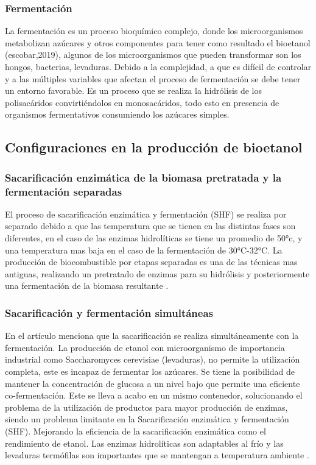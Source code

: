 \documentclass[12pt]{article}
\begin{document}
		
		
		\subsubsection{Fermentación}
		La fermentación es un proceso bioquímico complejo, donde los microorganismos metabolizan azúcares y otros componentes para tener como resultado el bioetanol (escobar,2019), algunos de los microorganismos que pueden transformar son los hongos, bacterias, levaduras. Debido a la complejidad, a que es difícil de controlar y a las múltiples variables que afectan el proceso de fermentación se debe tener un entorno favorable. \cite{rojas2010analisis}
		Es un proceso que se realiza la hidrólisis de los polisacáridos convirtiéndolos en monosacáridos, todo esto en presencia de organismos fermentativos consumiendo los azúcares simples.
		
		
		
		
		\subsection{Configuraciones en la producción de bioetanol}	
		\subsubsection{Sacarificación enzimática de la biomasa pretratada y la fermentación separadas}
		
		El proceso de sacarificación enzimática y fermentación (SHF) se realiza por separado debido a que las temperatura que se tienen en las distintas fases son diferentes, en el caso de las enzimas hidrolíticas se tiene un promedio de 50°c, y una temperatura mas baja en el caso de la fermentación de 30°C-32°C. 
		La producción de biocombustible por etapas separadas es una de las técnicas mas antiguas, realizando un pretratado de enzimas para su hidrólisis y posteriormente una fermentación de la biomasa resultante  \cite{CHOUDHARY201682}.
		
		
		
		
		\subsubsection{Sacarificación y fermentación simultáneas}
		
		En el artículo \cite{CHOUDHARY201682} menciona que la sacarificación se realiza simultáneamente con la fermentación.
		La producción de etanol con microorganismo de importancia industrial como Saccharomyces cerevisiae (levaduras), no permite la utilización completa, este es incapaz de fermentar los azúcares. Se tiene la posibilidad de mantener la concentración de glucosa a un nivel bajo que permite una eficiente co-fermentación.
		Este se lleva a acabo en un mismo contenedor, solucionando el problema de la utilización de productos para mayor producción de enzimas, siendo un problema limitante en la Sacarificación enzimática y fermentación (SHF). Mejorando la eficiencia de la sacarificación enzimática como el rendimiento de etanol. 
		Las enzimas hidrolíticas son adaptables al frío y las levaduras termófilas son importantes que se mantengan a temperatura ambiente \cite{CHOUDHARY201682}.
		
\end{document}
